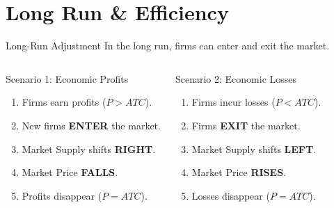 \documentclass[aspectratio=169, 10pt]{beamer}
\begin{document}
\section{Long Run \& Efficiency}

\begin{frame}{Long-Run Adjustment}
    In the long run, firms can enter and exit the market.
    
    \begin{columns}
        \begin{block}{Scenario 1: Economic Profits}
            \begin{enumerate}
                \item Firms earn profits ($P > ATC$).
                \item New firms \textbf{ENTER} the market.
                \item Market Supply shifts \textbf{RIGHT}.
                \item Market Price \textbf{FALLS}.
                \item Profits disappear ($P = ATC$).
            \end{enumerate}
        \end{block}
        
        \begin{block}{Scenario 2: Economic Losses}
            \begin{enumerate}
                \item Firms incur losses ($P < ATC$).
                \item Firms \textbf{EXIT} the market.
                \item Market Supply shifts \textbf{LEFT}.
                \item Market Price \textbf{RISES}.
                \item Losses disappear ($P = ATC$).
            \end{enumerate}
        \end{block}
    \end{columns}
\end{frame}
\end{document}
